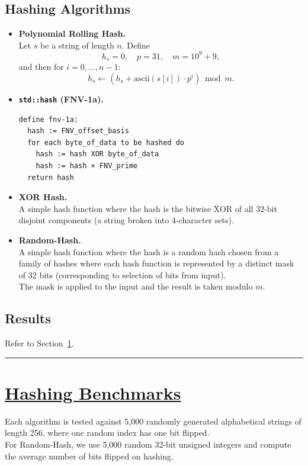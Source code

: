 \documentclass[12pt]{article}
\begin{document}
\subsection{Hashing Algorithms}\label{sec:hashing-algos-considered}
\begin{itemize}
  \item \textbf{Polynomial Rolling Hash.\cite{string_hashing_cp}}  \\
    Let $s$ be a string of length $n$. Define
    \[
      h_s = 0,\quad p = 31,\quad m = 10^9 + 9,
    \]
    and then for $i=0,\dots,n-1$:
    \[
      h_s \leftarrow (h_s + \mathrm{ascii}(s[i]) \cdot p^i)\bmod m.
    \]
  \item \textbf{\texttt{std::hash} (FNV-1a).\cite{fnv_hash}}
    \begin{verbatim}
define fnv-1a:
  hash := FNV_offset_basis
  for each byte_of_data to be hashed do
    hash := hash XOR byte_of_data
    hash := hash × FNV_prime
  return hash
    \end{verbatim}
  \item \textbf{XOR Hash.} \\
  A simple hash function where the hash is the bitwise XOR of all 32-bit disjoint components (a string broken into 4-character sets).
  \item \textbf{Random-Hash.}  \\
  A simple hash function where the hash is a random hash chosen from a family of hashes where each hash function is represented by a distinct mask of 32 bits (corresponding to selection of bits from input). \\
  The mask is applied to the input and the result is taken modulo $m$.
\end{itemize}

\subsection{Results}
Refer to Section~\ref{sec:hashing-benchmarks}.

\bigskip
\hrule height 1pt
\bigskip

\section{\hyperref[sec:hashing-detail]{Hashing Benchmarks}}\label{sec:hashing-benchmarks}

Each algorithm is tested against 5,000 randomly generated alphabetical strings of length 256, where one random index has one bit flipped.  \\
For Random-Hash, we use 5,000 random 32-bit unsigned integers and compute the average number of bits flipped on hashing.
\end{document}
